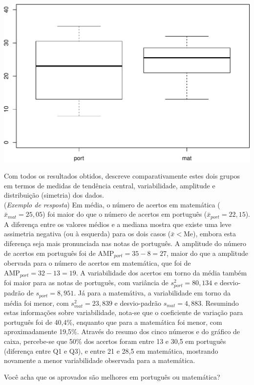 \documentclass[a4paper,11pt,fleqn]{article}\usepackage[]{graphicx}\usepackage[]{color}
\newenvironment{knitrout}{}{} %
\theoremstyle{definition}
\begin{document}
\begin{compactenum}[4.]
\begin{compactenum}
\begin{knitrout}
{\centering \includegraphics[width=.5\textwidth]{figure/unnamed-chunk-7-1} 

}



\end{knitrout}

\item Com todos os resultados obtidos, descreve comparativamente estes
    dois grupos em termos de medidas de tendência central,
    variabilidade, amplitude e distribuição (simetria) dos dados.\\
    (\textit{Exemplo de resposta}) Em média, o número de acertos em
    matemática ($\bar{x}_{mat} = 25,05$) foi maior do que o número de
    acertos em português ($\bar{x}_{port} = 22,15$). A diferença entre
    os valores médios e a mediana mostra que existe uma leve assimetria
    negativa (ou à esquerda) para os dois casos ($\bar{x} < \text{Me}$),
    embora esta diferença seja mais pronunciada nas notas de
    português. A amplitude do número de acertos em português foi de
    $\text{AMP}_{port} = 35-8=27$, maior do que a amplitude obervada
    para o número de acertos em matemática, que foi de
    $\text{AMP}_{port} = 32-13=19$. A variabilidade dos acertos em torno
    da média também foi maior para as notas de português, com variância
    de $s^2_{port} = 80,134$ e desvio-padrão de $s_{port} = 8,951$. Já
    para a matemátiva, a variabilidade em torno da média foi menor, com
    $s^2_{mat} = 23,839$ e desvio-padrão $s_{mat} = 4,883$. Resumindo
    estas informações sobre variabilidade, nota-se que o coeficiente de
    variação para português foi de 40,4\%, enquanto que para a
    matemática foi menor, com aproximadamente 19,5\%. Através do resumo
    dos cinco números e do gráfico de caixa, percebe-se que 50\% dos
    acertos foram entre 13 e 30,5 em português (diferença entre Q1 e
    Q3), e entre 21 e 28,5 em matemática, mostrando novamente a menor
    variabilidade observada para a matemática.
  \item Você acha que os aprovados são melhores em português ou
    matemática?
  \end{compactenum}
\end{compactenum}
\end{document}
